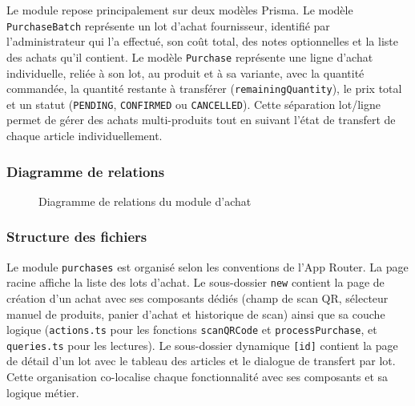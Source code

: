\documentclass[12pt,a4paper,openany]{report}
\newcommand{\code}[1]{\texttt{#1}}
\begin{document}
Le module repose principalement sur deux modèles Prisma. Le modèle \code{PurchaseBatch} représente un lot d'achat fournisseur, identifié par l'administrateur qui l'a effectué, son coût total, des notes optionnelles et la liste des achats qu'il contient. Le modèle \code{Purchase} représente une ligne d'achat individuelle, reliée à son lot, au produit et à sa variante, avec la quantité commandée, la quantité restante à transférer (\code{remainingQuantity}), le prix total et un statut (\code{PENDING}, \code{CONFIRMED} ou \code{CANCELLED}). Cette séparation lot/ligne permet de gérer des achats multi-produits tout en suivant l'état de transfert de chaque article individuellement.

\subsubsection{Diagramme de relations}

\begin{figure}[H]
\centering
{}
\caption{Diagramme de relations du module d'achat}
\end{figure}

\subsubsection{Structure des fichiers}

Le module \code{purchases} est organisé selon les conventions de l'App Router. La page racine affiche la liste des lots d'achat. Le sous-dossier \code{new} contient la page de création d'un achat avec ses composants dédiés (champ de scan QR, sélecteur manuel de produits, panier d'achat et historique de scan) ainsi que sa couche logique (\code{actions.ts} pour les fonctions \code{scanQRCode} et \code{processPurchase}, et \code{queries.ts} pour les lectures). Le sous-dossier dynamique \code{[id]} contient la page de détail d'un lot avec le tableau des articles et le dialogue de transfert par lot. Cette organisation co-localise chaque fonctionnalité avec ses composants et sa logique métier.
\end{document}
